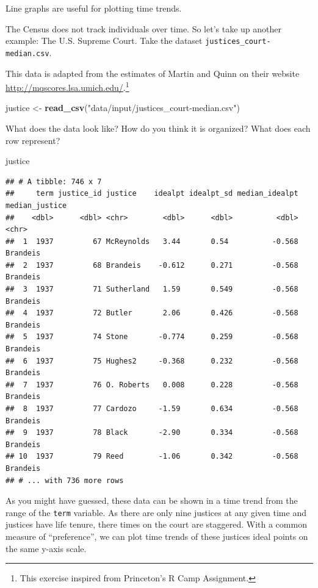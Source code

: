 \documentclass[
]{book}
\newenvironment{Shaded}{\begin{snugshade}}{\end{snugshade}}
\newcommand{\KeywordTok}[1]{\textcolor[rgb]{0.13,0.29,0.53}{\textbf{#1}}}
\newcommand{\NormalTok}[1]{#1}
\newcommand{\StringTok}[1]{\textcolor[rgb]{0.31,0.60,0.02}{#1}}
\theoremstyle{definition}
\theoremstyle{definition}
\theoremstyle{definition}
\theoremstyle{remark}
\begin{document}
Line graphs are useful for plotting time trends.

The Census does not track individuals over time. So let's take up another example: The U.S. Supreme Court. Take the dataset \texttt{justices\_court-median.csv}.

This data is adapted from the estimates of Martin and Quinn on their website \url{http://mqscores.lsa.umich.edu/}.\footnote{This exercise inspired from Princeton's R Camp Assignment.}

\begin{Shaded}
\begin{Highlighting}[]
\NormalTok{justice <{-}}\StringTok{ }\KeywordTok{read\_csv}\NormalTok{(}\StringTok{"data/input/justices\_court{-}median.csv"}\NormalTok{)}
\end{Highlighting}
\end{Shaded}

What does the data look like? How do you think it is organized? What does each row represent?

\begin{Shaded}
\begin{Highlighting}[]
\NormalTok{justice}
\end{Highlighting}
\end{Shaded}

\begin{verbatim}
## # A tibble: 746 x 7
##     term justice_id justice    idealpt idealpt_sd median_idealpt median_justice
##    <dbl>      <dbl> <chr>        <dbl>      <dbl>          <dbl> <chr>         
##  1  1937         67 McReynolds   3.44       0.54          -0.568 Brandeis      
##  2  1937         68 Brandeis    -0.612      0.271         -0.568 Brandeis      
##  3  1937         71 Sutherland   1.59       0.549         -0.568 Brandeis      
##  4  1937         72 Butler       2.06       0.426         -0.568 Brandeis      
##  5  1937         74 Stone       -0.774      0.259         -0.568 Brandeis      
##  6  1937         75 Hughes2     -0.368      0.232         -0.568 Brandeis      
##  7  1937         76 O. Roberts   0.008      0.228         -0.568 Brandeis      
##  8  1937         77 Cardozo     -1.59       0.634         -0.568 Brandeis      
##  9  1937         78 Black       -2.90       0.334         -0.568 Brandeis      
## 10  1937         79 Reed        -1.06       0.342         -0.568 Brandeis      
## # ... with 736 more rows
\end{verbatim}

As you might have guessed, these data can be shown in a time trend from the range of the \texttt{term} variable. As there are only nine justices at any given time and justices have life tenure, there times on the court are staggered. With a common measure of ``preference'', we can plot time trends of these justices ideal points on the same y-axis scale.
\end{document}
